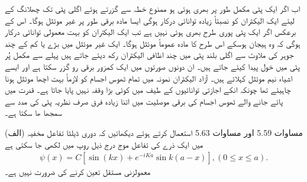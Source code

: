  اب اگر ایک پٹی مکمل طور پر بھری ہوئی ہو ممنوع خطہ سے گزرتے ہوئے اگلی پٹی تک چھلانگ کے لیئے ایک الیکٹران کو نصبتاً زیادہ توانائی درکار ہوگی ایسا مادہ برقی طور پر غیر موئثل ہوگا۔ اس کے برعکس اگر ایک پٹی پوری طرح بھری ہوئی نہیں ہے تب ایک الیکتران کو بہت معمولی توانائی درکار ہوگی کہ وہ ہیجان ہوسکے  اس طرح کا مادہ عموماً موئثل ہوگا۔ ایک غیر موئثل میں بڑے یا کم  کے چند جوہر کی ملاوٹ سے اگلی بلند پٹی میں چند اظافی الیکٹران رکھ دیئے جاتے ہیں پہلے سے مکمل پُر پٹی میں خول پیدا کیئے جاتے ہیں۔ ان دونوں صورتوں میں ایک کمزور برقی رو گزر سکتا ہے اور ایسے اشیاء نیم موئثل کہلاتے ہیں۔ آزاد الیکٹران نمونہ میں تمام ٹھوس اجسام کو لازماً بہت اچھا موئثل ہونا چاہیئے تھا چونکہ انکے اجازتی توانائیوں کے طیف میں کوئی بڑا وقفہ نہیں پایا جاتا ہے۔ قدرت میں پائے جانے والے ٹھوس اجسام کی برقی موصلیت میں اتنا زیادہ فرق صرف نظریہ پٹی کی مدد سے سمجھا ھا سکتا ہے۔  


(الف) مساوات \num{5.59} اور مساوات \num{5.63} استعمال کرتے ہوئے دیکھائیں کہ دوری ڈیلٹا تفاعل مخفیہ میں ایک ذرے کی تفاعل موج درج ذیل روپ میں لکھی جا سکتی ہے 
\begin{align*}
	\psi(x) = C[\sin(kx)+e^{-iKa}\sin k(a-x)], (0\leq x\leq a).
\end{align*} 
معمولزنی مستقل  تعین کرنے کی ضرورت نہیں ہے۔

